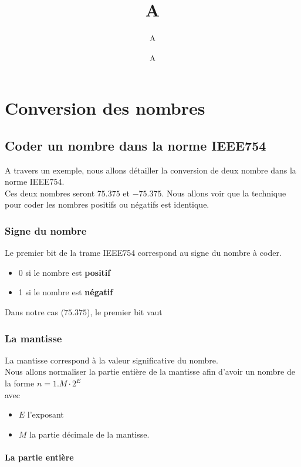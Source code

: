 \documentclass[12pt]{report}
\title{#1}
\author{#2}
\date{#3}
\newcommand{\setHeader}[3]{
\title{#1}
\author{#2}
\date{#3}
\maketitle
}
\renewcommand{\bold}[1]{\textbf{#1}}
\begin{document}
\setHeader{A}{A}{A}
\tableofcontents
\setcounter{page}{2}
\chapter{Conversion des nombres}     

\section{Coder un nombre dans la norme IEEE754}

A travers un exemple, nous allons détailler la conversion de deux nombre dans la norme IEEE754. \\
Ces deux nombres seront $75.375$ et $-75.375$. Nous allons voir que la technique pour coder les nombres positifs ou négatifs est identique.

\subsection{Signe du nombre}

Le premier bit de la trame IEEE754 correspond au signe du nombre à coder.

\begin{itemize}
	\item 0 si le nombre est \bold{positif}
	\item 1 si le nombre est \bold{négatif}

\end{itemize}

Dans notre cas ($75.375$), le premier bit vaut 

\subsection{La mantisse}

La mantisse correspond à la valeur significative du nombre. \\ 
Nous allons normaliser la partie entière de la mantisse afin d'avoir un nombre de la forme $n = 1.M \cdot 2^E$ \\

avec 
\begin{itemize}

\item $E$ l'exposant
\item $M$ la partie décimale de la mantisse.
\end{itemize}



\subsubsection{La partie entière}
\end{document}
